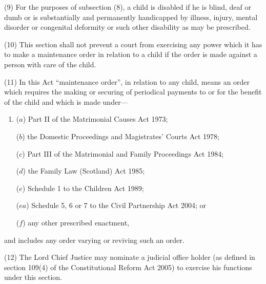 \documentclass[12pt,a4paper]{article}
\begin{document}
(9) For the purposes of subsection (8), a child is disabled if he is blind, deaf or dumb or is substantially and permanently handicapped by illness, injury, mental disorder or congenital deformity or such other disability as may be prescribed.

(10) This section shall not prevent a court from exercising any power which it has to make a maintenance order in relation to a child if the order is made against a person with care of the child.

(11) In this Act “maintenance order”, in relation to any child, means an order which requires the making or securing of periodical payments to or for the benefit of the child and which is made under—
\begin{enumerate}\item[]
($a$) Part II of the Matrimonial Causes Act 1973;

($b$) the Domestic Proceedings and Magistrates' Courts Act 1978;

($c$) Part III of the Matrimonial and Family Proceedings Act 1984;

($d$) the Family Law (Scotland) Act 1985;

($e$) Schedule 1 to the Children Act 1989; 

($ea$) Schedule 5, 6 or 7 to the Civil Partnership Act 2004; or

($f$) any other prescribed enactment,
\end{enumerate}
and includes any order varying or reviving such an order.

(12) The Lord Chief Justice may nominate a judicial office holder (as defined in section 109(4) of the Constitutional Reform Act 2005) to exercise his functions under this section.

\end{document}
